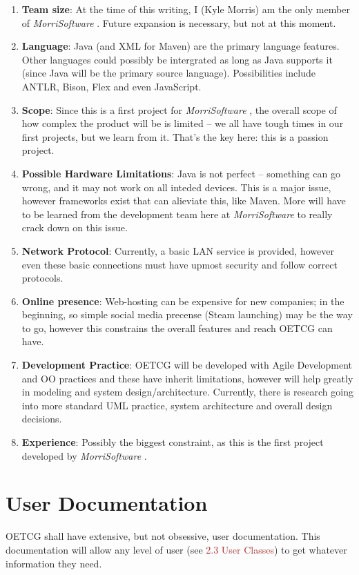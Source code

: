 \documentclass{scrreprt}
\def\orgname{\textit{MorriSoftware} }
\begin{document}
\begin{enumerate}
	\item \textbf{Team size}: At the time of this writing, I (Kyle Morris) am the only member of \orgname. Future expansion is necessary, but not at this moment.
	\item \textbf{Language}: Java (and XML for Maven) are the primary language features. Other languages could possibly be intergrated as long as Java supports it (since Java will be the primary source language). Possibilities include ANTLR, Bison, Flex and even JavaScript.
	\item \textbf{Scope}: Since this is a first project for \orgname, the overall scope of how complex the product will be is limited -- we all have tough times in our first projects, but we learn from it. That's the key here: this is a passion project.
	\item \textbf{Possible Hardware Limitations}: Java is not perfect -- something can go wrong, and it may not work on all inteded devices. This is a major issue, however frameworks exist that can alieviate this, like Maven. More will have to be learned from the development team here at \orgname to really crack down on this issue.
	\item \textbf{Network Protocol}: Currently, a basic LAN service is provided, however even these basic connections must have upmost security and follow correct protocols.
	\item \textbf{Online presence}: Web-hosting can be expensive for new companies; in the beginning, so simple social media precense (Steam launching) may be the way to go, however this constrains the overall features and reach OETCG can have.
	\item \textbf{Development Practice}: OETCG will be developed with Agile Development and OO practices and these have inherit limitations, however will help greatly in modeling and system design/architecture. Currently, there is research going into more standard UML practice, system architecture and overall design decisions. 
	\item \textbf{Experience}: Possibly the biggest constraint, as this is the first project developed by \orgname.
\end{enumerate}
\section{User Documentation}
OETCG shall have extensive, but not obsessive, user documentation. This documentation will allow any level of user (see \textcolor{brown}{2.3 User Classes}) to get whatever information they need.
\end{document}
